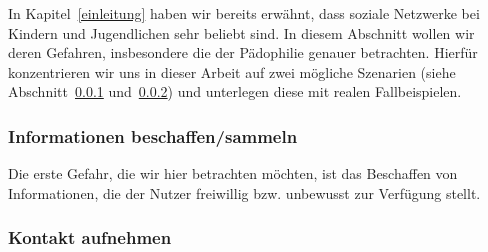 In Kapitel~\ref{einleitung} haben wir bereits erw\"ahnt, dass soziale Netzwerke
bei Kindern und Jugendlichen sehr beliebt sind. In diesem Abschnitt wollen wir
deren Gefahren, insbesondere die der P\"adophilie genauer betrachten. Hierf\"ur
konzentrieren wir uns in dieser Arbeit auf zwei m\"ogliche Szenarien (siehe
Abschnitt~\ref{gefahren:kinder:informationen}
und~\ref{gefahren:kinder:treffen}) und unterlegen diese mit realen
Fallbeispielen.

\subsubsection{Informationen beschaffen/sammeln}
\label{gefahren:kinder:informationen}
Die erste Gefahr, die wir hier betrachten m\"ochten, ist das Beschaffen von
Informationen, die der Nutzer freiwillig bzw. unbewusst zur Verf\"ugung stellt.


\subsubsection{Kontakt aufnehmen}
\label{gefahren:kinder:treffen}
